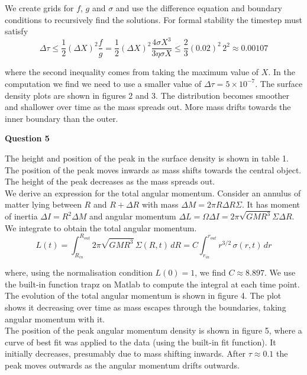 \documentclass[12pt]{extarticle}
\begin{document}
We create grids for $f$, $g$ and $\sigma$ and use the difference equation and boundary conditions to recursively find the solutions. For formal stability the timestep must satisfy 
$$\Delta\tau \leq \frac{1}{2}(\Delta X)^2\frac{f}{g} = \frac{1}{2} (\Delta X)^2\frac{4\sigma X^3}{3\eta \sigma X}\leq \frac{2}{3} (0.02)^2\,2^2 \approx 0.00107$$

where the second inequality comes from taking the maximum value of $X$. In the computation we find we need to use a smaller value of $\Delta \tau  = 5 \times 10^{-7}$. The surface density plots are shown in figures 2 and 3. The distribution becomes smoother and shallower over time as the mass spreads out. More mass drifts towards the inner boundary than the outer.  \\

\begin{center}
\textbf{Question 5}
\end{center}

The height and position of the peak in the surface density is shown in table 1. The position of the peak moves inwards as mass shifts towards the central object. The height of the peak decreases as the mass spreads out.\\

We derive an expression for the total angular momentum. Consider an annulus of matter lying between $R$ and $R+\Delta R$ with mass $\Delta M = 2\pi R\Delta R \Sigma$. It has moment of inertia $\Delta I = R^2\Delta M$ and angular momentum $\Delta L = \Omega \Delta I = 2\pi \sqrt{GMR^3}\Sigma \Delta R$. We integrate to obtain the total angular momentum.
$$L(t) = \int_{R_{in}}^{R_{out}}2\pi \sqrt{GMR^3}\,\Sigma(R,t)\, d R = C\int_{r_{in}}^{r_{out}} r^{3/2}\,\sigma(r,t) \, d r$$

where, using the normalisation condition $L(0) = 1$, we find $C\approx 8.897$. We use the built-in function trapz on Matlab to compute the integral at each time point. The evolution of the total angular momentum is shown in figure 4. The plot shows it decreasing over time as mass escapes through the boundaries, taking angular momentum with it. \\

The position of the peak angular momentum density is shown in figure 5, where a curve of best fit was applied to the data (using the built-in fit function). It initially decreases, presumably due to mass shifting inwards. After $\tau \approx 0.1$ the peak moves outwards as the angular momentum drifts outwards.\\
\end{document}
